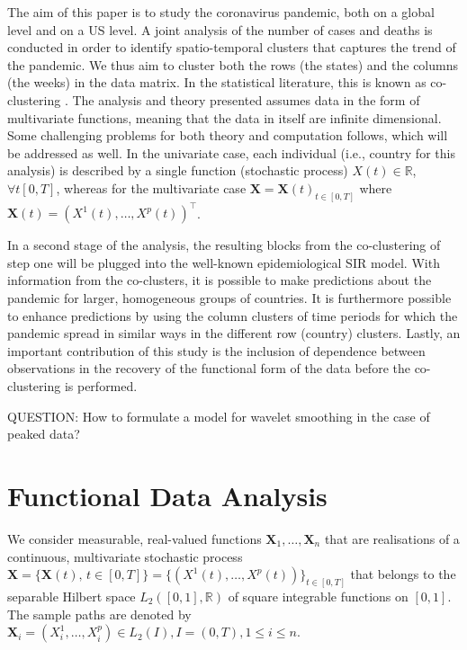 \documentclass[12pt,a4paper]{article}
\begin{document}
The aim of this paper is to study the coronavirus pandemic, both on a global level and on a US level. A joint analysis of the number of cases and deaths is conducted in order to identify spatio-temporal clusters that captures the trend of the pandemic. We thus aim to cluster both the rows (the states) and the columns (the weeks) in the data matrix. In the statistical literature, this is known as co-clustering \cite{Bouveyron}. The analysis and theory presented assumes data in the form of multivariate functions, meaning that the data in itself are infinite dimensional. Some challenging problems for both theory and computation follows, which will be addressed as well. In the univariate case, each individual (i.e., country for this analysis) is described by a single function (stochastic process) 
$
X(t) \in \mathbb{R}
$, 
$
\forall t [0, T]
$,
whereas for the multivariate case 
$
\mathbf{X} = \mathbf{X}(t)_{t \in [0, T]}
$ 
where 
$
\mathbf{X}(t) = (X^1(t),\ldots, X^p(t))^\top
$.     

In a second stage of the analysis, the resulting blocks from the co-clustering of step one will be plugged into the well-known epidemiological SIR model. With information from the co-clusters, it is possible to make predictions about the pandemic for larger, homogeneous groups of countries. It is furthermore possible to enhance predictions by using the column clusters of time periods for which the pandemic spread in similar ways in the different row (country) clusters. Lastly, an important contribution of this study is the inclusion of dependence between observations in the recovery of the functional form of the data before the co-clustering is performed. 

QUESTION: How to formulate a model for wavelet smoothing in the case of peaked data?


\section{Functional Data Analysis}
We consider measurable, real-valued functions 
$
\mathbf{X}_1, \ldots, \mathbf{X}_n
$
that are realisations of a continuous, multivariate stochastic process 
$
\mathbf{X} = \{\mathbf{X}(t), \, t \in [0,T]\} = \{(X^1(t), \ldots, X^p(t))\}_{t \in [0, T]}
$
that belongs to the separable Hilbert space $L_2([0, 1], \mathbb{R})$ of square integrable functions on $[0, 1]$. The sample paths are denoted by 
$
\mathbf{X}_i = (X_i^1, \ldots, X_i^p) \in L_2(I), I=(0, T), 1 \leq i \leq n
$.
\end{document}
